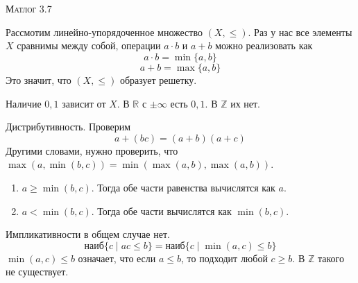 \documentclass[10pt]{article}
\begin{document}
\def\chap#1#2{\ \\ {\large\bf#1 \ | \ \tt\scshape#2} \par}

\ \vspace{-1cm}

{\bf
\ \\
\Large\centerline{\scshape Матлог 3.7}
}\normalsize

Рассмотим линейно-упорядоченное множество $(X, \leqslant)$.
Раз у нас все элементы $X$ сравнимы между собой, операции $a\cdot b$ и $a+b$ можно реализовать как
\[ a\cdot b = \min \{ a,b\} \]
\[ a+b = \max\{ a,b \} \] 
Это значит, что $(X, \leqslant)$ образует решетку.


Наличие $0,1$ зависит от $X$.
В $\mathbb{R}$ с $\pm \infty$ есть $0,1$.
В $\mathbb{Z}$ их нет.

Дистрибутивность.
Проверим \[ a+(bc) = (a+b)(a+c) \]
Другими словами, нужно проверить, что $\max (a, \min (b,c)) = \min (\max(a,b), \max(a,b))$.

\begin{enumerate}
    \item $a \geqslant \min(b,c)$. Тогда обе части равенства вычислятся как $a$.
    \item $a < \min(b,c)$. Тогда обе части вычислятся как $\min(b,c)$.
\end{enumerate}

Импликативности в общем случае нет.
\[\text{наиб} \{c \mid ac \leqslant b \} = \text {наиб} \{ c \mid \min(a,c) \leqslant b\} \]
$\min(a,c) \leqslant b$ означает, что если $a\leqslant b$, то подходит любой $c \geqslant b$.
В $\mathbb{Z}$ такого не существует.
\end{document}
